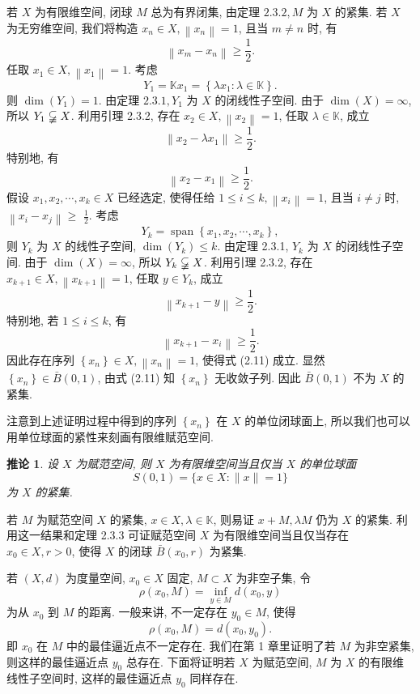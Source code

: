 \documentclass[openany]{ctexbook}
\makeatletter
\theoremstyle{kaiti}
\newtheorem{corollary}{推论}[section]
\theoremstyle{normal}
\renewenvironment{proof}[1][\proofname]{\par
    \pushQED{\qed}%
    \normalfont \topsep6\p@\@plus6\p@\relax
    \trivlist
    \item\relax
    {\heiti #1}\hspace{2\labelsep}\ignorespaces
  }{%
    \popQED\endtrivlist\@endpefalse
  }
\makeatother
\begin{document}
\begin{proof}
若 $X$ 为有限维空间, 闭球 $M$ 总为有界闭集, 由定理 $2.3.2, M$ 为 $X$ 的紧集. 若 $X$ 为无穷维空间, 我们将构造 $x_n \in X,\left\|x_n\right\|=1$, 且当 $m \neq n$ 时, 有
\begin{equation}
  \left\|x_m-x_n\right\| \geqslant \frac{1}{2}.
\end{equation}
任取 $x_1 \in X,\left\|x_1\right\|=1$. 考虑
$$
Y_1=\mathbb{K} x_1=\left\{\lambda x_1: \lambda \in \mathbb{K}\right\}.
$$
则 $\operatorname{dim}\left(Y_1\right)=1$. 由定理 $2.3.1, Y_1$ 为 $X$ 的闭线性子空间. 由于 $\operatorname{dim}(X)=\infty$, 所以 $Y_1 \varsubsetneqq X$. 利用引理 2.3.2, 存在 $x_2 \in X,\left\|x_2\right\|=1$, 任取 $\lambda \in \mathbb{K}$, 成立
$$
\left\|x_2-\lambda x_1\right\| \geqslant \frac{1}{2}.
$$
特别地, 有
$$
\left\|x_2-x_1\right\| \geqslant \frac{1}{2}.
$$
假设 $x_1, x_2, \cdots, x_{k} \in X$ 已经选定, 使得任给 $1 \leqslant i \leqslant k,\left\|x_{i}\right\|=1$, 且当 $i \neq j$ 时, $\left\|x_{i}-x_{j}\right\| \geqslant$ $\frac{1}{2}$. 考虑
$$
Y_{k}=\operatorname{span}\left\{x_1, x_2, \cdots, x_{k}\right\},
$$
则 $Y_{k}$ 为 $X$ 的线性子空间, $\operatorname{dim}\left(Y_{k}\right) \leqslant k$. 由定理 2.3.1, $Y_{k}$ 为 $X$ 的闭线性子空间. 由于 $\operatorname{dim}(X)=\infty$, 所以 $Y_{k} \varsubsetneqq X$. 利用引理 2.3.2, 存在 $x_{k+1} \in X,\left\|x_{k+1}\right\|=1$, 任取 $y \in Y_{k}$, 成立
$$
\left\|x_{k+1}-y\right\| \geqslant \frac{1}{2}.
$$
特别地, 若 $1 \leqslant i \leqslant k$, 有
$$
\left\|x_{k+1}-x_{i}\right\| \geqslant \frac{1}{2}.
$$
因此存在序列 $\left\{x_n\right\} \in X,\left\|x_n\right\|=1$, 使得式 (2.11) 成立. 显然 $\left\{x_n\right\} \in \bar{B}(0,1)$, 由式 (2.11) 知 $\left\{x_n\right\}$ 无收敛子列. 因此 $\bar{B}(0,1)$ 不为 $X$ 的紧集.
\end{proof}

注意到上述证明过程中得到的序列 $\left\{x_n\right\}$ 在 $X$ 的单位闭球面上, 所以我们也可以用单位球面的紧性来刻画有限维赋范空间.

\begin{corollary}
设 $X$ 为赋范空间, 则 $X$ 为有限维空间当且仅当 $X$ 的单位球面
$$
S(0,1)=\{x \in X:\|x\|=1\}
$$
为 $X$ 的紧集.
\end{corollary}

若 $M$ 为赋范空间 $X$ 的紧集, $x \in X, \lambda \in \mathbb{K}$, 则易证 $x+M, \lambda M$ 仍为 $X$ 的紧集. 利用这一结果和定理 2.3.3 可证赋范空间 $X$ 为有限维空间当且仅当存在 $x_0 \in X, r>0$, 使得 $X$ 的闭球 $\bar{B}\left(x_0, r\right)$ 为紧集.

若 $(X, d)$ 为度量空间, $x_0 \in X$ 固定, $M \subset X$ 为非空子集, 令
$$
\rho\left(x_0, M\right)=\inf_{y \in M} d\left(x_0, y\right)
$$
为从 $x_0$ 到 $M$ 的距离. 一般来讲, 不一定存在 $y_0 \in M$, 使得
$$
\rho\left(x_0, M\right)=d\left(x_0, y_0\right).
$$
即 $x_0$ 在 $M$ 中的最佳逼近点不一定存在. 我们在第 1 章里证明了若 $M$ 为非空紧集, 则这样的最佳逼近点 $y_0$ 总存在. 下面将证明若 $X$ 为赋范空间, $M$ 为 $X$ 的有限维线性子空间时, 这样的最佳逼近点 $y_0$ 同样存在.
\end{document}
